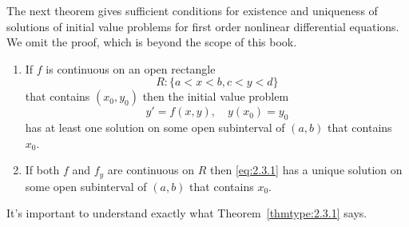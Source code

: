 \documentclass{ximera}
\begin{document}
The next theorem gives sufficient conditions for existence and
uniqueness of solutions of initial value problems for first order
nonlinear differential equations. We omit the proof, which is beyond
the scope of this book.

\begin{theorem}\label{thmtype:2.3.1} 
\begin{enumerate}
\item\label{thmtype:2.3.1a}
 If  $f$ is continuous
on an open rectangle
$$
R:  \{ a < x < b, c < y < d \}
$$
 that contains $(x_0,y_0)$
then  the initial value problem
\begin{equation} \label{eq:2.3.1}
y'=f(x,y), \quad y(x_0)=y_0
\end{equation}
 has at least one solution  on some open subinterval
of  $(a,b)$ that contains $x_0.$

\item\label{thmtype:2.3.1b}
 If  both $f$ and  $f_y$ are
 continuous on $R$ then \eqref{eq:2.3.1} has a unique
solution on some open subinterval  of $(a,b)$ that contains $x_0$.
\end{enumerate}
\end{theorem}


It's important to understand exactly what Theorem~\ref{thmtype:2.3.1}
says.
\end{document}
